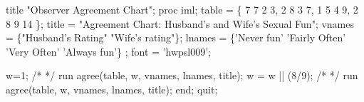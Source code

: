 \begin{listing}
title "Observer Agreement Chart";
proc iml;
   table =
     \{  7     7     2      3,
        2     8     3      7,
        1     5     4      9,
        2     8     9     14 \};
   title  = "Agreement Chart: Husband's and Wife's Sexual Fun";
   vnames = \{"Husband's Rating" "Wife's rating"\};
   lnames = \{'Never fun' 'Fairly Often' 'Very Often' 'Always fun'\} ;
   font = 'hwpsl009';
   
   w=1;                     /*  */
   run agree(table, w, vnames, lnames, title);
   w = w || (8/9);          /*  */
   run agree(table, w, vnames, lnames, title);
   end;
quit;
\end{listing}
